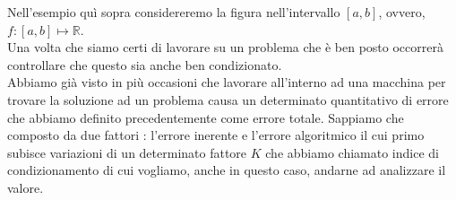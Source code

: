 \documentclass[12pt, a4paper]{book}
\theoremstyle{definition}
\begin{document}
\begin{flushleft}
\begin{figure}[!h]
\end{figure}


Nell'esempio quì sopra considereremo la figura nell'intervallo $[a,b]$, ovvero, $f : [a,b] \mapsto \mathbb{R}$.\\
Una volta che siamo certi di lavorare su un problema che è ben posto occorrerà controllare che questo sia anche ben condizionato. \\
Abbiamo già visto in più occasioni che lavorare all'interno ad una macchina per trovare la soluzione ad un problema causa un determinato quantitativo di errore che abbiamo definito precedentemente come errore totale. 
Sappiamo che composto da due fattori : l'errore inerente e l'errore algoritmico il cui primo subisce variazioni di un determinato fattore $K$ che abbiamo chiamato indice di condizionamento di cui vogliamo, anche in questo caso, andarne ad analizzare il valore.
\end{flushleft}
\end{document}
